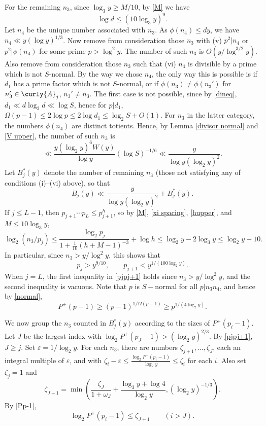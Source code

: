 \documentclass[11pt]{amsart}
\theoremstyle{remark}
\theoremstyle{plain}
\numberwithin{equation}{section}
\newcommand{\be}{\begin{equation}}
\newcommand{\ee}{\end{equation}}
\newcommand{\eps}{\ensuremath{\varepsilon}}
\newcommand{\e}{\ensuremath{\varepsilon}}
\renewcommand{\(}{\left(}
\renewcommand{\)}{\right)}
\renewcommand{\le}{\leqslant}
\renewcommand{\ge}{\geqslant}
\newcommand{\om}{\Omega}
\begin{document}
For the remaining $n_3$,
since $\log_3 y \ge M/10$, by \eqref{M} we have
\be\label{dineq}
\log d \le (10\log_3y)^9.
\ee 
Let $n_4$ be the unique number associated with $n_3$.
As $\phi(n_4)\le dy$, we have $n_4\ll y(\log y)^{1/3}$.
Now remove from consideration those $n_3$ with (v) 
$p^2|n_4$ or $p^2|\phi(n_4)$ for
some prime $p>\log^2 y$.  The number of such $n_3$ is 
$O(y/\log^{3/2} y)$.
Also remove from consideration those $n_3$ such that (vi)
$n_4$ is divisible by a prime which is not $S$-normal.  
By the way we chose $n_4$, the only way this is possible is if 
$d_1$ has a prime factor which is not $S$-normal, or if
$\phi(n_3) \ne \phi(n_3')$ for $n_3'\in\curly{A}_j$, $n_3'\ne n_3$.   The first case is not possible,  since by \eqref{dineq},
$d_1 \ll d\log_2 d \ll \log S$,
hence for $p|d_1$, $\om(p-1)\le 2\log p\le 2\log d_1\le \log_2 S+O(1)$.
For $n_3$ in the latter category, the numbers $\phi(n_4)$ are distinct
 totients.  Hence, by Lemma \ref{divisor normal} and
\eqref{V upper}, the number of such $n_3$ is
\[
\ll \frac{y(\log_2 y)^6 W(y)}{\log y} (\log S)^{-1/6}
\ll \frac{y}{\log y (\log_2 y)^2}.
\]
Let $B_j^*(y)$ denote the number of remaining $n_3$
(those not satisfying any of conditions (i)--(vi) above), so that
\be\label{BjBj*}
B_j(y) \ll \frac{y}{\log y (\log_2 y)^2} + B_j^*(y).
\ee
If $j\le L-1$, then
$p_{j+1} \cdots p_L \le p_{j+1}^h$, so by  \eqref{M},
\eqref{xi spacing}, \eqref{hupper}, and $M\le 10\log_3 y$,
\[
\log_2 (n_3/p_j) \le \frac{\log_2 p_j}{1+\frac1{10}(h+M-1)^{-3}} + \log h 
\le \log_2 y - 2\log_3 y \le \log_2 y -10.
\]
In particular, since $n_3>y/\log^2 y$, this shows that
\be\label{pjpj+1}
p_j > y^{9/10}, \qquad p_{j+1}<y^{1/(100\log_2 y)}.
\ee
When $j=L$, the first inequality in \eqref{pjpj+1} holds since $n_3>y/\log^2 y$,
and the second inequality is vacuous.  Note that $p$ is $S-$normal for all $p|n_3n_4$, and hence by \eqref{normal},
\be\label{Pp-1}
P^+(p-1) \ge (p-1)^{1/\Omega(p-1)} \ge p^{1/(4\log_2 y)}.
\ee


We now group the $n_3$ counted in $B_j^*(y)$ according to the sizes
of $P^+(p_i-1)$.  Let $J$ be the largest index with $\log_2 P^+(p_J-1)
> (\log_2 y)^{2/3}$.  By \eqref{pjpj+1}, $J\ge j$.
Set $\eps=1/\log_2 y$.
For each $n_3$, there are numbers $\zeta_{j+1},\ldots, \zeta_{J}$, 
each an integral multiple of $\e$, and with $\zeta_i-\eps \le 
\frac{\log_2 P^+(p_i-1)}{\log_2 y} \le \zeta_i$ for each $i$.
Also  set $\zeta_j=1$ and 
\be\label{zetaJ}
\zeta_{J+1} = \min\( \frac{\zeta_J}{1+\omega_J} + \frac{\log_3 y+\log 4}{\log_2 y}, (\log_2 y)^{-1/3} \).
\ee
By \eqref{Pp-1},
\be\label{Ppi-1}
\log_2 P^+(p_i-1) \le \zeta_{J+1} \qquad (i>J).
\ee
\end{document}

